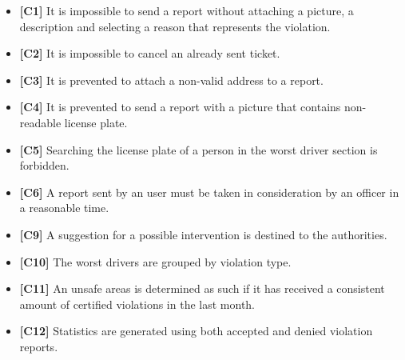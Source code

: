 \begin{itemize}
		\item \textbf{[\hypertarget{C1}{C1}]} It is impossible to send a report without attaching a picture, a description and selecting a reason that represents the violation. 
		\item \textbf{[\hypertarget{C2}{C2}]} It is impossible to cancel an already sent ticket. 
		\item \textbf{[\hypertarget{C3}{C3}]} It is prevented to attach a non-valid address to a report.
		\item \textbf{[\hypertarget{C4}{C4}]} It is prevented to send a report with a picture that contains non-readable license plate. 
		\item \textbf{[\hypertarget{C5}{C5}]} Searching the license plate of a person in the worst driver section is forbidden.
		\item \textbf{[\hypertarget{C6}{C6}]} A report sent by an user must be taken in consideration by an officer in a reasonable time.
		\item \textbf{[\hypertarget{C9}{C9}]} A suggestion for a possible intervention is destined to the authorities.
		\item \textbf{[\hypertarget{C10}{C10}]} The worst drivers are grouped by violation type.
		\item \textbf{[\hypertarget{C11}{C11}]} An unsafe areas is determined as such if it has received a consistent amount of certified violations in the last month. 
		\item \textbf{[\hypertarget{C12}{C12}]} Statistics are generated using both accepted and denied violation reports.
		
		
	\end{itemize}
\clearpage

